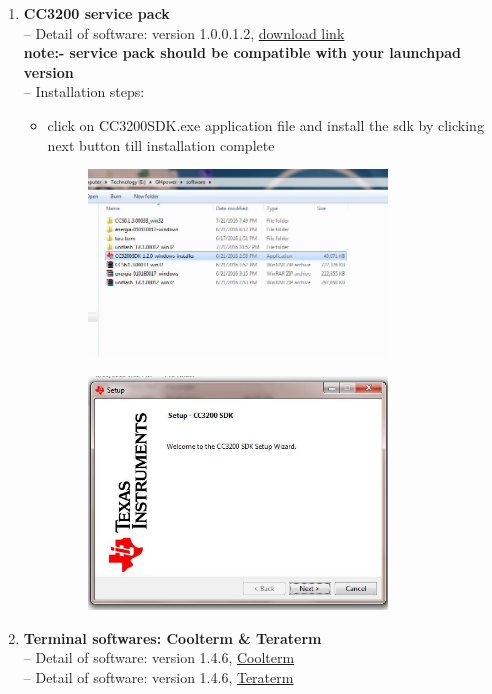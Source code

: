\documentclass[a4paper,12pt,oneside]{book}
\begin{document}
\begin{enumerate}
\begin{itemize}
\begin{figure}[h]
	 \end{figure}
\end{itemize}
\newpage
\item\textbf{ CC3200 service pack} \\
-- Detail of software: version 1.0.0.1.2, \href{http://www.ti.com}{download link}\\
   \textbf{note:- service pack should be compatible with your launchpad version}\\
-- Installation steps:
\begin{itemize}
	\item click on CC3200SDK.exe application file and install the sdk by clicking next button till installation complete
	\begin{figure}[h]
		\hspace{2cm}
		\includegraphics[width=300px]{inst14}
	\end{figure}
	\begin{figure}[h]
		\hspace{2cm}
		\includegraphics[width=300px]{inst15}
	\end{figure}
\end{itemize}
\newpage
\item\textbf{ Terminal softwares: Coolterm \& Teraterm} \\
-- Detail of software: version 1.4.6, \href{http://www.coolterm.com}{Coolterm}\\
-- Detail of software: version 1.4.6, \href{http://www.coolterm.com}{Teraterm}\\

\end{enumerate}
\end{document}
